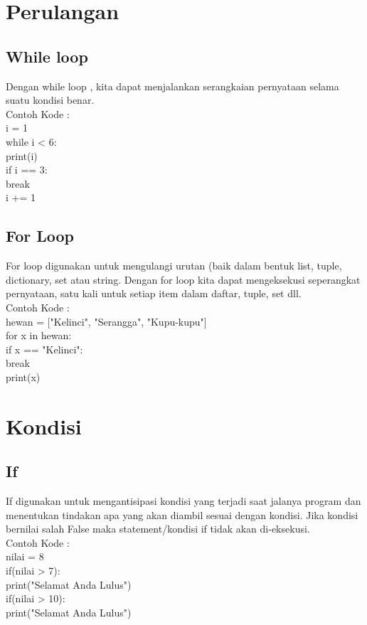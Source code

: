 \section{Perulangan}
\subsection{While loop}
Dengan while loop , kita dapat menjalankan serangkaian pernyataan selama suatu kondisi benar.\\
Contoh Kode :\\
i = 1\\
while i < 6:\\
  print(i)\\
  if i == 3:\\
    break\\
  i += 1\\
\subsection{For Loop}
For loop digunakan untuk mengulangi urutan (baik dalam bentuk list, tuple, dictionary, set atau string.
Dengan for loop kita dapat mengeksekusi seperangkat pernyataan, satu kali untuk setiap item dalam daftar, tuple, set dll.\\
Contoh Kode :\\
hewan = ["Kelinci", "Serangga", "Kupu-kupu"]\\
for x in hewan:\\
  if x == "Kelinci":\\
    break\\
  print(x)\\

\section{Kondisi}
\subsection{If}
If digunakan untuk mengantisipasi kondisi yang terjadi saat jalanya program dan menentukan tindakan apa yang akan diambil sesuai dengan kondisi. Jika kondisi bernilai salah False maka statement/kondisi if tidak akan di-eksekusi.\\
Contoh Kode :\\
nilai = 8\\
if(nilai > 7):\\
    print("Selamat Anda Lulus")\\
if(nilai > 10):\\
    print("Selamat Anda Lulus")\\

